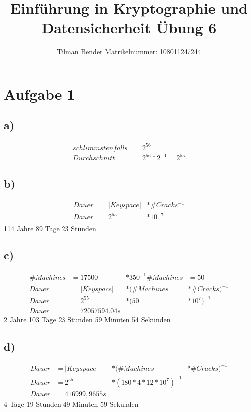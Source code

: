 \documentclass[10pt,a4paper]{article}
\author{Tilman Bender   Matrikelnummer: 108011247244\\}
\title{Einführung in Kryptographie und Datensicherheit Übung 6}
\begin{document}
\maketitle

\section*{Aufgabe 1}
\subsection*{a)}
\begin{align*} 
	schlimmstenfalls &= 2^{56} \\
	Durchschnitt &= 2^{56} * 2^{-1}=2^{55}
\end{align*}

\subsection*{b)}
\begin{align*} 
	Dauer &= |Keyspace| &* \#Cracks^{-1}\\
	Dauer &= 2^{55}&*10^{-7}\\
\end{align*}
114 Jahre 89 Tage 23 Stunden 
\subsection*{c)}
\begin{align*} 
	\#Machines &= 17500 &* 350^{-1}
	\#Machines &=50\\	
	Dauer &= |Keyspace| &* (\#Machines &* \#Cracks)^{-1}\\
	Dauer &= 2^{55}&*(50&*10^{7})^{-1}\\
	Dauer &= 72057594.04 s
\end{align*}
2 Jahre 103 Tage 23 Stunden 59 Minuten 54 Sekunden
\subsection*{d)}
\begin{align*} 
	Dauer &= |Keyspace| &* (\#Machines &* \#Cracks)^{-1}\\
	Dauer &= 2^{55}&*(180*4*12*10^{7})^{-1}\\
	Dauer &=416999,9655 s
\end{align*}
4 Tage 19 Stunden 49 Minuten 59 Sekunden
\end{document}
